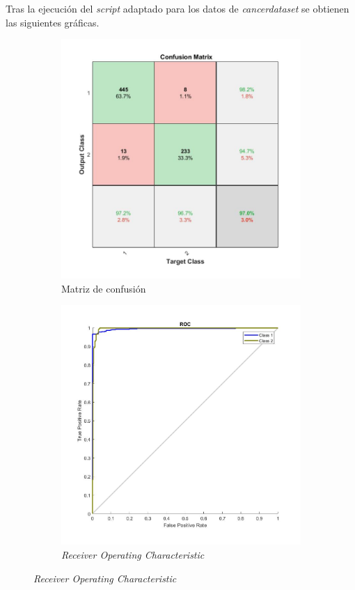 \documentclass{article}
\begin{document}
Tras la ejecución del \textit{script} adaptado para los datos de
\textit{cancer\textunderscore dataset} se obtienen las siguientes gráficas.

\begin{figure}[H]
 \centering
 \begin{subfigure}{0.45\textwidth}
  \includegraphics[width=0.9\linewidth]{../images/I_ex4_confusion_cancer_dataset.jpg}
  \caption{Matriz de confusión}
  \label{conf}
 \end{subfigure}
 \begin{subfigure}{0.45\textwidth}
  \includegraphics[width=0.9\linewidth]{../images/I_ex4_roc_cancer_dataset.jpg}
  \caption{\textit{Receiver Operating Characteristic}}
  \label{roc}
 \end{subfigure}
\end{figure}
\end{document}
